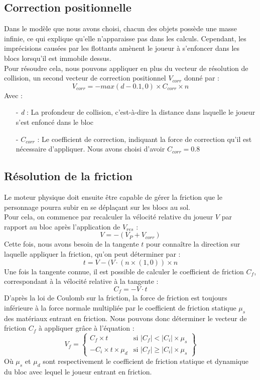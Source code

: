 \documentclass[10pt]{report}
\begin{document}
\subsection{Correction positionnelle}
Dans le modèle que nous avons choisi, chacun des objets possède une masse infinie,
ce qui explique qu'elle n'apparaisse pas dans les calculs.
Cependant, les imprécisions causées par les flottants amènent le joueur à s'enfoncer dans les blocs
lorsqu'il est immobile dessus.\\
Pour résoudre cela, nous pouvons appliquer en plus du vecteur de résolution de collision,
un second vecteur de correction positionnel \(V_{corr}\) donné par :
\[V_{corr} = -max(d-0.1,0) \times C_{corr} \times n\]
Avec :\\
\begin{itemize}
  \item[-] \emph{d} : La profondeur de collision, c'est-à-dire la distance dans laquelle
  le joueur s'est enfoncé dans le bloc
  \item[-] \(C_{corr}\) : Le coefficient de correction, indiquant la force de correction
  qu'il est nécessaire d'appliquer.
  Nous avons choisi d'avoir \(C_{corr}=0.8\)
\end{itemize}

\subsection{Résolution de la friction} \label{physique:friction}
Le moteur physique doit ensuite être capable de gérer la friction que le personnage pourra subir en
se déplaçant sur les blocs au sol.\\
Pour cela, on commence par recalculer la vélocité relative du joueur \(V\) par rapport au bloc après
l'application de \(V_{res}\) :
\[V =  - (V_{P} + V_{corr})\]
Cette fois, nous avons besoin de la tangente \(t\) pour connaître la direction sur laquelle appliquer la friction,
qu'on peut déterminer par :
\[t = V - (V \cdot (n \times (1,0)) \times n\]
Une fois la tangente connue, il est possible de calculer le coefficient de friction \(C_{f}\),
correspondant à la vélocité relative à la tangente :
\[C_{f} = - V \cdot t\]
D'après la loi de Coulomb sur la friction, la force de friction est toujours inférieure à la force normale
multipliée par le coefficient de friction statique \(\mu_{s}\) des matériaux entrant en friction.
Nous pouvons donc déterminer le vecteur de friction \(C_{f}\) à appliquer grâce à l'équation :
\[
V_{f} = \left\{\begin{array}{lr}
           C_{f} \times t & \text{si } |C_{f}| < |C_{i}| \times \mu_{s}\\
          -C_{i} \times t \times \mu_{d} & \text{si } |C_{f}| \geq |C_{i}| \times \mu_{s}
        \end{array}\right\}
\]
Où \(\mu_{s}\) et \(\mu_{d}\) sont respectivement le coefficient de friction statique et dynamique du bloc avec lequel
le joueur entrant en friction.
\end{document}
